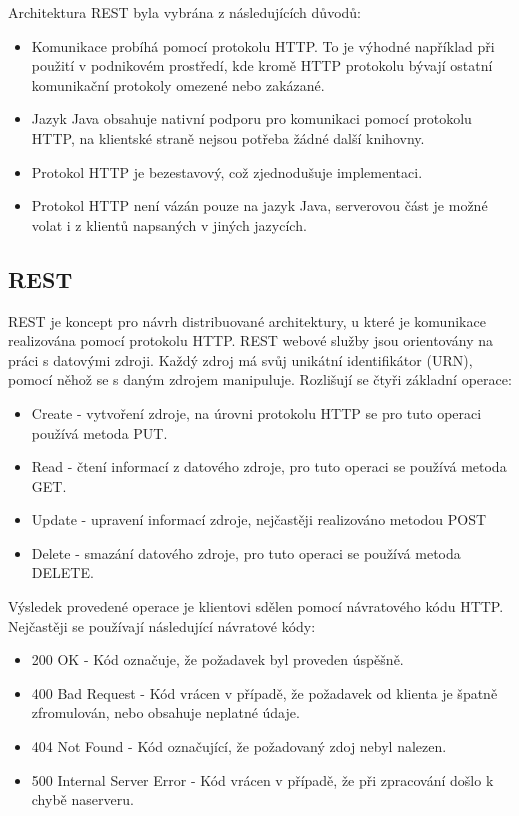 Architektura \gls{REST} byla vybrána z následujících důvodů:
\begin{itemize}
  \item Komunikace probíhá pomocí protokolu \gls{HTTP}. To je výhodné například
  při použití v podnikovém prostředí, kde kromě \gls{HTTP} protokolu bývají
  ostatní komunikační protokoly omezené nebo zakázané.
  \item Jazyk Java obsahuje nativní podporu pro komunikaci pomocí protokolu
  \gls{HTTP}, na klientské straně nejsou potřeba žádné další knihovny.
  \item Protokol \gls{HTTP} je bezestavový, což zjednodušuje implementaci.
  \item Protokol \gls{HTTP} není vázán pouze na jazyk Java, serverovou část je
  možné volat i z klientů napsaných v jiných jazycích.
\end{itemize}

\subsection{REST}

\gls{REST} je koncept pro návrh distribuované architektury, u které je
komunikace realizována pomocí protokolu \gls{HTTP}. \gls{REST} webové služby
jsou orientovány na práci s datovými zdroji. Každý zdroj má svůj unikátní
identifikátor (\gls{URN}), pomocí něhož se s daným zdrojem manipuluje. Rozlišují
se čtyři základní operace:

\begin{itemize}
  \item Create - vytvoření zdroje, na úrovni protokolu \gls{HTTP} se pro tuto
  operaci používá metoda PUT.
  \item Read - čtení informací z datového zdroje, pro tuto operaci se používá
  metoda GET.
  \item Update - upravení informací zdroje, nejčastěji realizováno metodou POST
  \item Delete - smazání datového zdroje, pro tuto operaci se používá metoda
  DELETE.
\end{itemize}

Výsledek provedené operace je klientovi sdělen pomocí návratového kódu
\gls{HTTP}. Nejčastěji se používají následující návratové kódy:

\begin{itemize}
  \item 200 OK - Kód označuje, že požadavek byl proveden úspěšně.
  \item 400 Bad Request - Kód vrácen v případě, že požadavek od klienta je
  špatně zfromulován, nebo obsahuje neplatné údaje.
  \item 404 Not Found - Kód označující, že požadovaný zdoj nebyl nalezen.
  \item 500 Internal Server Error - Kód vrácen v případě, že při zpracování
  došlo k chybě naserveru.
\end{itemize}

